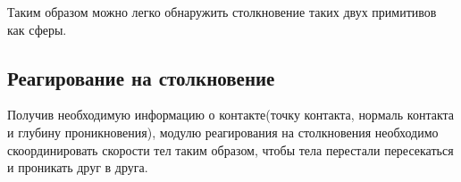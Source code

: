 Таким образом можно легко обнаружить столкновение таких двух примитивов как сферы.
\subsection{Реагирование на столкновение}
Получив необходимую информацию о контакте(точку контакта, нормаль контакта и глубину проникновения), модулю реагирования
на столкновения необходимо скоординировать скорости тел таким образом, чтобы тела перестали пересекаться и проникать друг в друга.  

